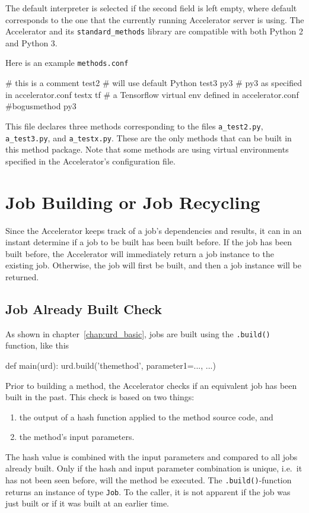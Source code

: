 The default interpreter is selected if the second field is left empty,
where default corresponds to the one that the currently running
Accelerator server is using.  The Accelerator and
its \texttt{standard\_methods} library are compatible with both Python
2 and Python 3.

Here is an example \texttt{methods.conf}
\begin{shell}
# this is a comment
test2                # will use default Python
test3           py3  # py3 as specified in accelerator.conf
testx           tf   # a Tensorflow virtual env defined in accelerator.conf
#bogusmethod    py3
\end{shell}
This file declares three methods corresponding to the files
\texttt{a\_test2.py}, \texttt{a\_test3.py}, and \texttt{a\_testx.py}.
These are the only methods that can be built in this method package.
Note that some methods are using virtual environments specified in the
Accelerator's configuration file.



\section{Job Building or Job Recycling}
Since the Accelerator keeps track of a job's dependencies and results,
it can in an instant determine if a job to be built has been built
before.  If the job has been built before, the Accelerator will
immediately return a job instance to the existing job.  Otherwise, the
job will first be built, and then a job instance will be returned.


\subsection{Job Already Built Check}
As shown in chapter~\ref{chap:urd_basic}, jobs are built using
the \texttt{.build()} function, like this
\begin{python}
def main(urd):
    urd.build('themethod', parameter1=..., ...)
\end{python}

Prior to building a method, the Accelerator checks if an equivalent
job has been built in the past.  This check is based on two things:
\begin{enumerate}
\item  the output of a hash function applied to the method source code, and
\item  the method's input parameters.
\end{enumerate}
The hash value is combined with the input parameters and compared to
all jobs already built.  Only if the hash and input parameter
combination is unique, i.e.\ it has not been seen before, will the
method be executed.  The
\texttt{.build()}-function returns an instance of type \texttt{Job}.
To the caller, it is not apparent if the job was just built or if it
was built at an earlier time.



